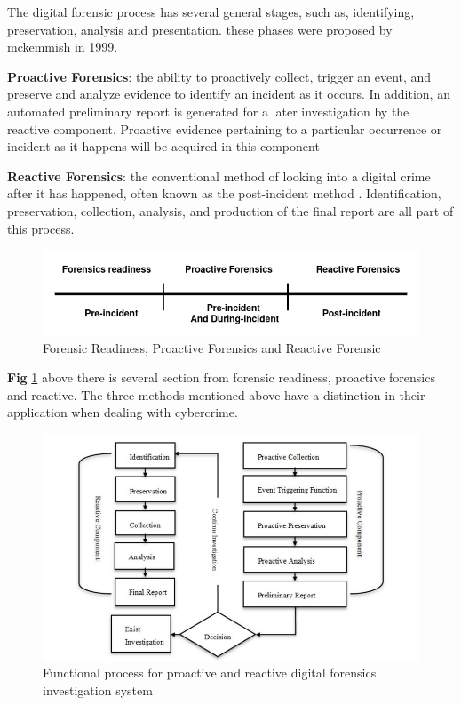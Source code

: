 The digital forensic process has several general stages, such as, identifying, preservation, analysis and presentation. these phases were proposed by mckemmish in 1999.

\textbf{Proactive Forensics}: the ability to proactively collect, trigger an
event, and preserve and analyze evidence to identify an incident as it occurs. In addition, an automated preliminary report is generated for a later
investigation by the reactive component. Proactive evidence pertaining to
a particular occurrence or incident as it happens will be acquired in this
component \cite{proactiveandreactivedigitalforensics}

\textbf{Reactive Forensics}:  the conventional method of looking into
a digital crime after it has happened, often known as the post-incident
method \cite{proactiveandreactivedigitalforensics}. Identification, preservation, collection, analysis, and production of the final report are all part of this process.

\begin{figure}[H] 
    \centering
    \includegraphics[width=14cm]{figure/flow-fr-pro-react.jpg}
    \caption{Forensic Readiness, Proactive Forensics and Reactive Forensic }
    \label{fig:fr-pro-reac}
\end{figure}

\textbf{Fig} \ref{fig:fr-pro-reac} above there is several section from forensic readiness, proactive forensics and reactive. The three methods mentioned above have a distinction in their application when dealing with cybercrime.

\begin{figure}[H] 
    \centering
    \includegraphics[width=14cm]{figure/proactive-reactive-flow-process.jpg}
    \caption{Functional process for proactive and reactive digital forensics investigation system \cite{proactiveandreactivedigitalforensics}}
    \label{fig:flow-pro-react}
\end{figure}


